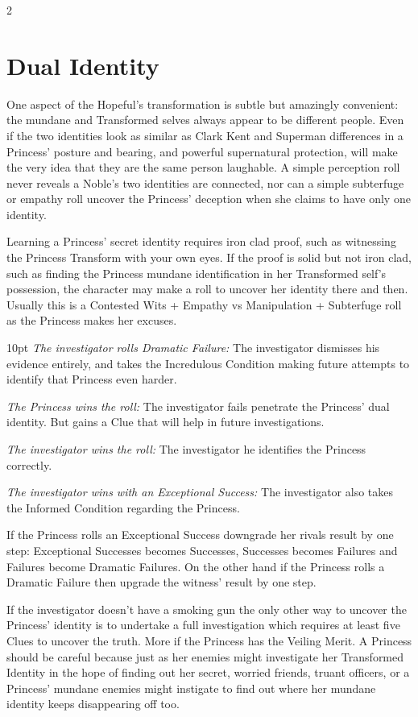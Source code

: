 \begin{multicols}{2}
\section*{Dual Identity}
\label{sec:DualIdentity}

One aspect of the Hopeful's transformation is subtle but amazingly convenient: the mundane and Transformed selves always appear to be different people. Even if the two identities look as similar as Clark Kent and Superman differences in a Princess' posture and bearing, and powerful supernatural protection, will make the very idea that they are the same person laughable. A simple perception roll never reveals a Noble's two identities are connected, nor can a simple subterfuge or empathy roll uncover the Princess' deception when she claims to have only one identity. 

Learning a Princess' secret identity requires iron clad proof, such as witnessing the Princess Transform with your own eyes. If the proof is solid but not iron clad, such as finding the Princess mundane identification in her Transformed self's possession, the character may make a roll to uncover her identity there and then. Usually this is a Contested Wits + Empathy vs Manipulation + Subterfuge roll as the Princess makes her excuses. 

\begin{myindentpar}{10pt}
    \emph{The investigator rolls Dramatic Failure:} The investigator dismisses his evidence entirely, and takes the Incredulous Condition making future attempts to identify that Princess even harder. 
    
    \emph{The Princess wins the roll:} The investigator fails penetrate the Princess' dual identity. But gains a Clue that will help in future investigations. 
    
    \emph{The investigator wins the roll:} The investigator he identifies the Princess correctly.
    
    \emph{The investigator wins with an Exceptional Success:} The investigator also takes the Informed Condition regarding the Princess. 
\end{myindentpar}

If the Princess rolls an Exceptional Success downgrade her rivals result by one step: Exceptional Successes becomes Successes, Successes becomes Failures and Failures become Dramatic Failures. On the other hand if the Princess rolls a Dramatic Failure then upgrade the witness' result by one step.

If the investigator doesn't have a smoking gun the only other way to uncover the Princess' identity is to undertake a full investigation which requires at least five Clues to uncover the truth. More if the Princess has the Veiling Merit. A Princess should be careful because just as her enemies might investigate her Transformed Identity in the hope of finding out her secret, worried friends, truant officers, or a Princess' mundane enemies might instigate to find out where her mundane identity keeps disappearing off too.


\end{multicols}
